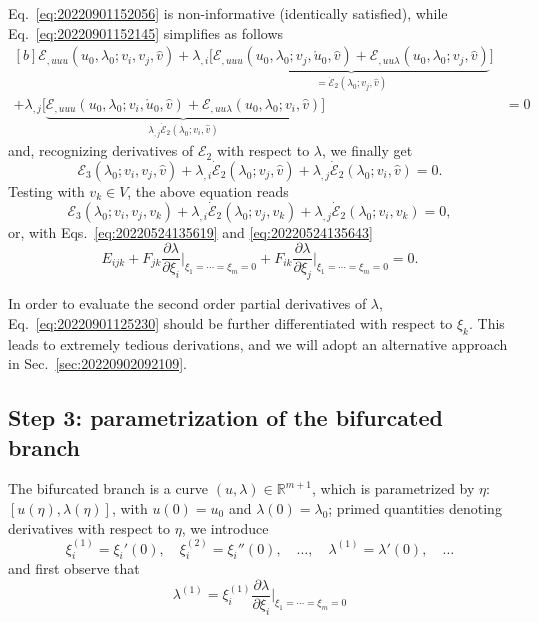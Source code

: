 \documentclass[12pt, final]{scrartcl}
\theoremstyle{definition}
\newcommand{\E}{\mathcal E}
\newcommand{\order}[2][1]{#2^{(#1)}}
\newcommand{\reals}{\mathbb{R}}
\begin{document}
Eq.~\eqref{eq:20220901152056} is non-informative (identically satisfied), while Eq.~\eqref{eq:20220901152145} simplifies
as follows
\begin{equation}
  \begin{aligned}[b]
    \E_{,uuu}(u_0, \lambda_0; v_i , v_j, \hat{v}) + \lambda_{,i} \bigl[ \underbrace{\E_{,uuu}(u_0, \lambda_0; v_j , \mathring{u}_0, \hat{v}) + \E_{,uu\lambda}(u_0, \lambda_0; v_j, \hat{v})}_{=\dot{\E}_2(\lambda_0; v_j, \hat{v})} \bigr]&\\
    +\lambda_{,j} \bigl[ \underbrace{\E_{,uuu}(u_0, \lambda_0; v_i , \mathring{u}_0, \hat{v}) + \E_{,uu\lambda}(u_0, \lambda_0; v_i, \hat{v})}_{\lambda_{,j} \dot{\E}_2(\lambda_0; v_i, \hat{v})} \bigr] &= 0
  \end{aligned}
\end{equation}
and, recognizing derivatives of $\E_2$ with respect to $\lambda$, we finally get
\begin{equation}
    \E_3(\lambda_0; v_i , v_j, \hat{v}) + \lambda_{,i} \dot{\E}_2(\lambda_0; v_j, \hat{v}) + \lambda_{,j} \dot{\E}_2(\lambda_0; v_i, \hat{v}) = 0.
\end{equation}
Testing with $v_k \in V$, the above equation reads
\begin{equation}
  \E_3(\lambda_0; v_i , v_j, v_k) + \lambda_{,i} \dot{\E}_2(\lambda_0; v_j, v_k) + \lambda_{,j} \dot{\E}_2(\lambda_0; v_i, v_k) = 0,
\end{equation}
or, with Eqs.~\eqref{eq:20220524135619} and \eqref{eq:20220524135643}
\begin{equation}
  \label{eq:20220902125031}
  E_{ijk} +  F_{jk} \frac{\partial\lambda}{\partial\xi_i} \biggr\rvert_{\xi_1 = \cdots = \xi_m = 0} + F_{ik} \frac{\partial\lambda}{\partial\xi_j} \biggr\rvert_{\xi_1 = \cdots = \xi_m = 0} = 0.
\end{equation}

In order to evaluate the second order partial derivatives of $\lambda$, Eq.~\eqref{eq:20220901125230} should be further
differentiated with respect to $\xi_k$. This leads to extremely tedious derivations, and we will adopt an alternative
approach in Sec.~\ref{sec:20220902092109}.

\subsection{Step 3: parametrization of the bifurcated branch}
\label{sec:20221020140320}

The bifurcated branch is a curve $(u, \lambda) \in \reals ^ {m + 1}$, which is parametrized by $\eta$:
$[u(\eta), \lambda(\eta)]$, with $u(0) = u_0$ and $\lambda(0) = \lambda_0$; primed quantities denoting derivatives with
respect to $\eta$, we introduce
\begin{equation}
  \order[1]{\xi_i} = \xi_i'(0), \quad
  \order[2]{\xi_i} = \xi_i''(0), \quad \ldots, \quad
  \order[1]{\lambda} = \lambda'(0), \quad \ldots
\end{equation}
and first observe that
\begin{equation}
  \order[1]{\lambda} = \order[1]{\xi_i} \frac{\partial\lambda}{\partial\xi_i} \biggr\rvert_{\xi_1 = \cdots = \xi_m = 0}
\end{equation}
\end{document}
